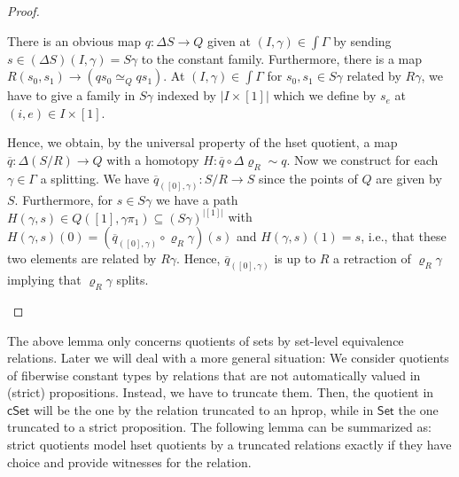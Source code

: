 \documentclass[10pt,a4paper]{article}
\theoremstyle{definition}
\theoremstyle{remark}
\newcommand{\Set}{\mathsf{Set}}
\newcommand{\cSet}{\mathsf{cSet}}
\begin{document}
\begin{proof}
\begin{description}[font=\normalfont,leftmargin=0cm]
    There is an obvious map \(q \colon \Delta S \to Q\) given at \((I, \gamma) \in \int\Gamma\) by sending \(s \in (\Delta S)(I, \gamma) = S\gamma\) to the constant family.
    Furthermore, there is a map \(R(s_0, s_1) \to (qs_0 \simeq_{Q} qs_1)\).
    At \((I, \gamma) \in \int\Gamma\) for \(s_0, s_1 \in S\gamma\) related by \(R\gamma\), we have to give a family in \(S\gamma\) indexed by \(|I \times [1]|\) which we define by \(s_e\) at \((i, e) \in I \times [1]\).

    Hence, we obtain, by the universal property of the hset quotient, a map \(\overline q \colon \Delta(S/R) \to Q\) with a homotopy \(H \colon \overline q \circ \Delta\varrho_R \sim q\).
    Now we construct for each \(\gamma \in \Gamma\) a splitting.
    We have \(\overline{q}_{([0], \gamma)} \colon S/R \to S\) since the points of \(Q\) are given by \(S\).
    Furthermore, for \(s \in S\gamma\) we have a path \(H(\gamma, s) \in Q([1], \gamma\pi_1) \subseteq {(S\gamma)}^{|[1]|}\) with \(H(\gamma, s)(0) = (\overline{q}_{([0], \gamma)} \circ \varrho_R\gamma)(s)\) and \(H(\gamma, s)(1) = s\), i.e., that these two elements are related by \(R\gamma\).
    Hence, \(\overline{q}_{([0], \gamma)}\) is up to \(R\) a retraction of \(\varrho_R\gamma\) implying that \(\varrho_R\gamma\) splits. \qedhere
  \end{description}
\end{proof}


The above lemma only concerns quotients of sets by set-level equivalence relations.
Later we will deal with a more general situation: We consider quotients of fiberwise constant types by relations that are not automatically valued in (strict) propositions.
Instead, we have to truncate them.
Then, the quotient in \(\cSet\) will be the one by the relation truncated to an hprop, while in \(\Set\) the one truncated to a strict proposition.
The following lemma can be summarized as: strict quotients model hset quotients by a truncated relations exactly if they have choice and provide witnesses for the relation.
\end{document}
